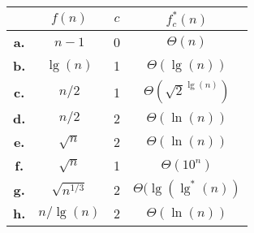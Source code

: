\documentclass{article}
\begin{document}
\begin{enumerate}
\begin{center}
\begin{tabular}{c c c | c |}
 & $f(n)$ & $c$ & $f_{c}^{*}(n)$ \\ \hline
\textbf{a.} & $n-1$ & 0 & $\Theta(n)$ \\ \hline
\textbf{b.} & $\lg(n)$ & 1 & $\Theta(\lg(n))$ \\ \hline
\textbf{c.} & $n/2$ & 1 & $\Theta(\sqrt{2}^{\lg(n)})$ \\ \hline
\textbf{d.} & $n/2$ & 2 & $\Theta(\ln(n))$ \\ \hline
\textbf{e.} & $\sqrt{n}$ & 2 & $\Theta(\ln(n))$ \\ \hline
\textbf{f.} & $\sqrt{n}$ & 1 & $\Theta(10^{n})$ \\ \hline
\textbf{g.} & $\sqrt{n^{1/3}}$ & 2 & $\Theta(\lg(\lg^{*}(n))$ \\ \hline
\textbf{h.} & $n/\lg(n)$ & 2 & $\Theta(\ln(n))$ \\ \hline
\end{tabular}
\end{center}


\end{enumerate}
\end{document}
